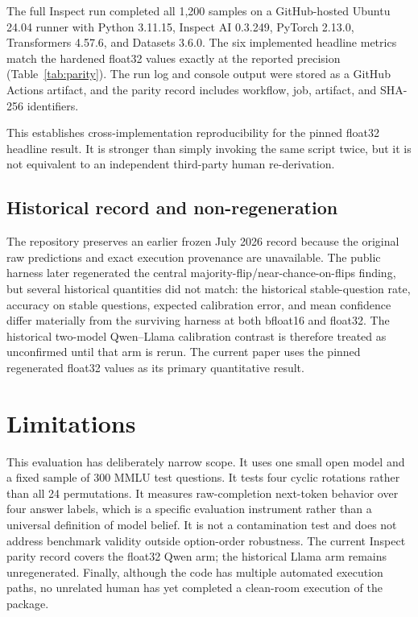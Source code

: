 \documentclass[10pt]{article}
\begin{document}
The full Inspect run completed all 1,200 samples on a GitHub-hosted Ubuntu 24.04 runner with Python 3.11.15, Inspect AI 0.3.249, PyTorch 2.13.0, Transformers 4.57.6, and Datasets 3.6.0. The six implemented headline metrics match the hardened float32 values exactly at the reported precision (Table~\ref{tab:parity}). The run log and console output were stored as a GitHub Actions artifact, and the parity record includes workflow, job, artifact, and SHA-256 identifiers.

This establishes cross-implementation reproducibility for the pinned float32 headline result. It is stronger than simply invoking the same script twice, but it is not equivalent to an independent third-party human re-derivation.

\subsection{Historical record and non-regeneration}

The repository preserves an earlier frozen July 2026 record because the original raw predictions and exact execution provenance are unavailable. The public harness later regenerated the central majority-flip/near-chance-on-flips finding, but several historical quantities did not match: the historical stable-question rate, accuracy on stable questions, expected calibration error, and mean confidence differ materially from the surviving harness at both bfloat16 and float32. The historical two-model Qwen--Llama calibration contrast is therefore treated as unconfirmed until that arm is rerun. The current paper uses the pinned regenerated float32 values as its primary quantitative result.

\section{Limitations}

This evaluation has deliberately narrow scope. It uses one small open model and a fixed sample of 300 MMLU test questions. It tests four cyclic rotations rather than all 24 permutations. It measures raw-completion next-token behavior over four answer labels, which is a specific evaluation instrument rather than a universal definition of model belief. It is not a contamination test and does not address benchmark validity outside option-order robustness. The current Inspect parity record covers the float32 Qwen arm; the historical Llama arm remains unregenerated. Finally, although the code has multiple automated execution paths, no unrelated human has yet completed a clean-room execution of the package.
\end{document}
